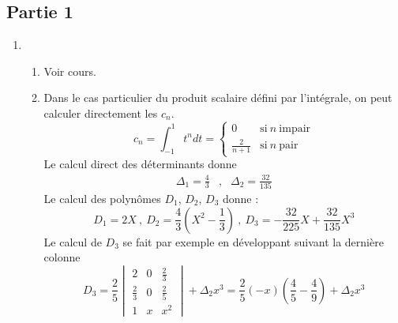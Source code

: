 \subsection*{Partie 1}
\begin{enumerate}
 \item 
 \begin{enumerate}
   \item Voir cours.
   \item Dans le cas particulier du produit scalaire défini par l'intégrale, on peut calculer directement les $c_n$.
\begin{displaymath}
 c_n = \int_{-1}^1 t^n dt = \left\lbrace 
\begin{array}{ll}
0 & \mathrm{si}\: n \:\mathrm{impair} \\ 
\frac{2}{n+1} & \mathrm{si}\: n\: \mathrm{pair} 
 \end{array}
\right. 
\end{displaymath}
Le calcul direct des déterminants donne
\begin{eqnarray*}
 \Delta_1 = \frac{4}{3} &,& \Delta_2 = \frac{32}{135}
\end{eqnarray*}
Le calcul des polynômes $D_1$, $D_2$, $D_3$ donne :
\begin{displaymath}
 D_1 = 2X \:,\: D_2 = \frac{4}{3}(X^2-\frac{1}{3}) \:,\: D_3 = -\frac{32}{225}X + \frac{32}{135} X^3
\end{displaymath}
Le calcul de $D_3$ se fait par exemple en développant suivant la dernière colonne
\renewcommand{\arraystretch}{1.6}
\begin{displaymath}
 D_3 = \frac{2}{5}  
\begin{vmatrix}
2 & 0 & \frac{2}{3} \\ 
\frac{2}{3} & 0 & \frac{2}{5} \\ 
1 & x & x^2
\end{vmatrix}
+\Delta_2 x^3
= \frac{2}{5}(-x)(\frac{4}{5}-\frac{4}{9})+\Delta_2 x^3
\end{displaymath}


\end{enumerate}
\end{enumerate}
